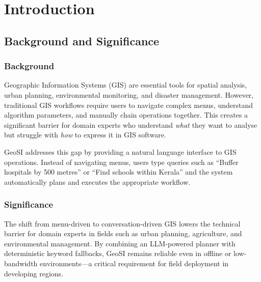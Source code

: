 \documentclass[12pt,a4paper]{report}
\begin{document}
\newpage

\begingroup
\footnotesize
\tableofcontents
\endgroup
\newpage

\setcounter{page}{1}

\chapter{Introduction}

\section{Background and Significance}

\subsection{Background}

Geographic Information Systems (GIS) are essential tools for spatial analysis, urban planning, environmental monitoring, and disaster management.  However, traditional GIS workflows require users to navigate complex menus, understand algorithm parameters, and manually chain operations together.  This creates a significant barrier for domain experts who understand \emph{what} they want to analyse but struggle with \emph{how} to express it in GIS software.

GeoSI addresses this gap by providing a natural language interface to GIS operations.  Instead of navigating menus, users type queries such as ``Buffer hospitals by 500 metres'' or ``Find schools within Kerala'' and the system automatically plans and executes the appropriate workflow.

\subsection{Significance}

The shift from menu-driven to conversation-driven GIS lowers the technical barrier for domain experts in fields such as urban planning, agriculture, and environmental management.  By combining an LLM-powered planner with deterministic keyword fallbacks, GeoSI remains reliable even in offline or low-bandwidth environments---a critical requirement for field deployment in developing regions.
\end{document}
